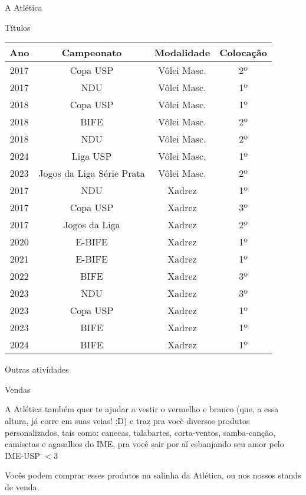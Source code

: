 \begin{secao}{A Atlética}
\begin{subsecao}{Títulos}
\begin{center}
\begin{tabular}{|c|c|c|c|}
  \hline
  Ano & Campeonato & Modalidade & Colocação\\
  \hline
    2017 & Copa USP       & Vôlei Masc.     & 2º\\
    2017 & NDU            & Vôlei Masc.     & 1º\\
    2018 & Copa USP       & Vôlei Masc.     & 1º\\
    2018 & BIFE           & Vôlei Masc.     & 2º\\
    2018 & NDU            & Vôlei Masc.     & 2º\\
    2024 & Liga USP       & Vôlei Masc.     & 1º\\
    2023 & Jogos da Liga Série Prata & Vôlei Masc. & 2º\\
    2017 & NDU            & Xadrez          & 1º\\
    2017 & Copa USP       & Xadrez          & 3º\\
    2017 & Jogos da Liga  & Xadrez          & 2º\\
    2020 & E-BIFE         & Xadrez          & 1º\\
    2021 & E-BIFE         & Xadrez          & 1º\\
    2022 & BIFE           & Xadrez          & 3º\\
    2023 & NDU            & Xadrez          & 3º\\
    2023 & Copa USP       & Xadrez          & 1º\\
    2023 & BIFE           & Xadrez          & 1º\\
    2024 & BIFE           & Xadrez          & 1º\\
    \hline
  \end{tabular}
\end{center}

\end{subsecao}
\begin{subsecao}{Outras atividades}

\begin{subsubsecao}{Vendas}

A Atlética também quer te ajudar a vestir o vermelho e branco (que, a essa
altura, já corre em suas veias! :D) e traz pra você diversos produtos
personalizados, tais como: canecas, talabartes, corta-ventos,
samba-canção, camisetas e agasalhos do
IME, pra você sair por aí esbanjando seu amor pelo IME-USP $<$3

Vocês podem comprar esses produtos na salinha da Atlética, ou nos nossos
stands de venda.


\end{subsubsecao}
\end{subsecao}
\end{secao}
